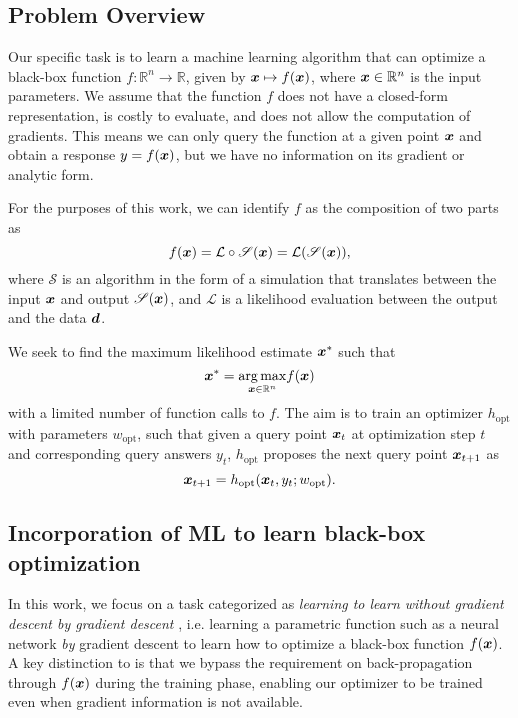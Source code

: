 \subsection{Problem Overview}
\label{sec:problem}
Our specific task is to learn a machine learning algorithm that can optimize a black-box function $f: \mathbb{R}^{n}\rightarrow\mathbb{R}$, given by $\boldsymbol{x} \mapsto f(\boldsymbol{x})$, where $\boldsymbol{x} \in \mathbb{R}^{n}$ is the input parameters. We assume that the function $f$ does not have a closed-form representation, is costly to evaluate, and does not allow the computation of gradients. This means we can only query the function at a given point $\boldsymbol{x}$ and obtain a response $y = f(\boldsymbol{x})$, but we have no information on its gradient or analytic form. 

For the purposes of this work, we can identify $f$ as the composition of two parts as
\begin{equation}
    f(\boldsymbol{x}) = \mathcal{L} \circ \mathscr{S} (\boldsymbol{x}) = \mathcal{L}(\mathscr{S} (\boldsymbol{x})),
\end{equation}
where $\mathscr{S}$ is an algorithm in the form of a simulation that translates between the input $\boldsymbol{x}$ and output $\mathscr{S}(\boldsymbol{x})$, and $\mathcal{L}$ is a likelihood evaluation between the output and the data $\boldsymbol{d}$. 

We seek to find the maximum likelihood estimate $\boldsymbol{x}^*$ such that
\begin{equation}
    \boldsymbol{x}^*= \underset{\boldsymbol{x} \in \mathbb{R}^{n}}{\arg\max} f(\boldsymbol{x})
\end{equation}
with a limited number of function calls to $f$. The aim is to train an optimizer $h_{\mathrm{opt}}$ with parameters $w_{\mathrm{opt}}$, such that given a query point $\boldsymbol{x}_{t}$ at optimization step $t$ and corresponding query answers $y_{t}$, $h_{\mathrm{opt}}$ proposes the next query point $\boldsymbol{x}_{t+1}$ as
\begin{equation}
    \boldsymbol{x}_{t+1} = h_{\mathrm{opt}}(\boldsymbol{x}_{t}, y_{t}; w_{\mathrm{opt}}).
    \label{eq:sec_updates}
\end{equation}

\subsection{Incorporation of ML to learn black-box optimization}
\label{sec:ml_dfo}
In this work, we focus on a task categorized as \textit{learning to learn without gradient descent by gradient descent} \citep{Chen2016}, i.e. learning a parametric function such as a neural network \textit{by} gradient descent to learn how to optimize a black-box function $f(\boldsymbol{x})$. A key distinction to \citep{Chen2016} is that we bypass the requirement on back-propagation through $f(\boldsymbol{x})$ during the training phase, enabling our optimizer to be trained even when gradient information is not available. 

